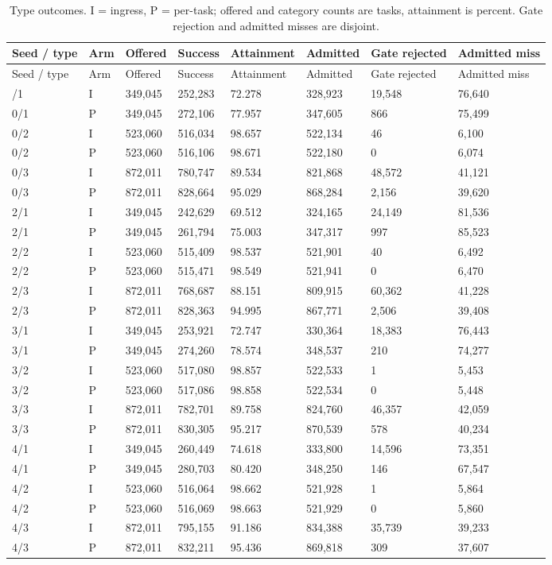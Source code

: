 \documentclass[11pt,a4paper]{article}
\begin{document}
\begingroup
\small
\begin{xltabular}{\textwidth}{@{}YYYYYYYY@{}}
\caption{Type outcomes. I = ingress, P = per-task; offered and category counts are tasks, attainment is percent. Gate rejection and admitted misses are disjoint.}\label{tab:D1} \\
\toprule
Seed / type & Arm & Offered & Success & Attainment & Admitted & Gate rejected & Admitted miss \\
\midrule\endfirsthead
\toprule
Seed / type & Arm & Offered & Success & Attainment & Admitted & Gate rejected & Admitted miss \\
\midrule\endhead
\bottomrule{}/1 & I & 349,045 & 252,283 & 72.278 & 328,923 & 19,548 & 76,640 \\
0/1 & P & 349,045 & 272,106 & 77.957 & 347,605 & 866 & 75,499 \\
0/2 & I & 523,060 & 516,034 & 98.657 & 522,134 & 46 & 6,100 \\
0/2 & P & 523,060 & 516,106 & 98.671 & 522,180 & 0 & 6,074 \\
0/3 & I & 872,011 & 780,747 & 89.534 & 821,868 & 48,572 & 41,121 \\
0/3 & P & 872,011 & 828,664 & 95.029 & 868,284 & 2,156 & 39,620 \\
2/1 & I & 349,045 & 242,629 & 69.512 & 324,165 & 24,149 & 81,536 \\
2/1 & P & 349,045 & 261,794 & 75.003 & 347,317 & 997 & 85,523 \\
2/2 & I & 523,060 & 515,409 & 98.537 & 521,901 & 40 & 6,492 \\
2/2 & P & 523,060 & 515,471 & 98.549 & 521,941 & 0 & 6,470 \\
2/3 & I & 872,011 & 768,687 & 88.151 & 809,915 & 60,362 & 41,228 \\
2/3 & P & 872,011 & 828,363 & 94.995 & 867,771 & 2,506 & 39,408 \\
3/1 & I & 349,045 & 253,921 & 72.747 & 330,364 & 18,383 & 76,443 \\
3/1 & P & 349,045 & 274,260 & 78.574 & 348,537 & 210 & 74,277 \\
3/2 & I & 523,060 & 517,080 & 98.857 & 522,533 & 1 & 5,453 \\
3/2 & P & 523,060 & 517,086 & 98.858 & 522,534 & 0 & 5,448 \\
3/3 & I & 872,011 & 782,701 & 89.758 & 824,760 & 46,357 & 42,059 \\
3/3 & P & 872,011 & 830,305 & 95.217 & 870,539 & 578 & 40,234 \\
4/1 & I & 349,045 & 260,449 & 74.618 & 333,800 & 14,596 & 73,351 \\
4/1 & P & 349,045 & 280,703 & 80.420 & 348,250 & 146 & 67,547 \\
4/2 & I & 523,060 & 516,064 & 98.662 & 521,928 & 1 & 5,864 \\
4/2 & P & 523,060 & 516,069 & 98.663 & 521,929 & 0 & 5,860 \\
4/3 & I & 872,011 & 795,155 & 91.186 & 834,388 & 35,739 & 39,233 \\
4/3 & P & 872,011 & 832,211 & 95.436 & 869,818 & 309 & 37,607 \\
\end{xltabular}
\endgroup
\end{document}
